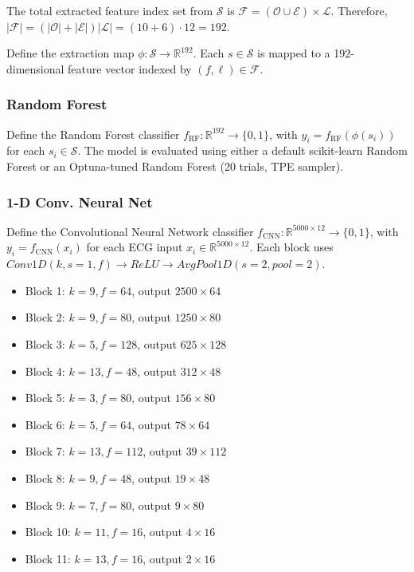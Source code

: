 \documentclass[sigconf,nonacm]{acmart}
\begin{document}
The total extracted feature index set from $\mathcal{S}$ is $\mathcal{F}=(\mathcal{O}\cup\mathcal{E})\times\mathcal{L}$.
Therefore, $|\mathcal{F}|=(|\mathcal{O}|+|\mathcal{E}|)|\mathcal{L}|=(10+6)\cdot 12=192$.

Define the extraction map $\phi:\mathcal{S}\to\mathbb{R}^{192}$.
Each $s\in\mathcal{S}$ is mapped to a 192-dimensional feature vector indexed by $(f,\ell)\in\mathcal{F}$.

\subsubsection{Random Forest}
Define the Random Forest classifier $f_{\mathrm{RF}}:\mathbb{R}^{192}\to\{0,1\}$, with $y_i=f_{\mathrm{RF}}(\phi(s_i))$ for each $s_i\in\mathcal{S}$.
The model is evaluated using either a default scikit-learn Random Forest or an Optuna-tuned Random Forest (20 trials, TPE sampler).

\subsubsection{1-D Conv. Neural Net}
Define the Convolutional Neural Network classifier $f_{\mathrm{CNN}}:\mathbb{R}^{5000 \times 12}\to\{0,1\}$, with
$y_i=f_{\mathrm{CNN}}(x_i)$ for each ECG input $x_i\in\mathbb{R}^{5000 \times 12}$.
Each block uses $Conv1D(k, s=1, f) \to ReLU \to AvgPool1D(s=2, pool=2)$.

\begin{itemize}
\item Block 1: $k=9, f=64$, output $2500 \times 64$
\item Block 2: $k=9, f=80$, output $1250 \times 80$
\item Block 3: $k=5, f=128$, output $625 \times 128$
\item Block 4: $k=13, f=48$, output $312 \times 48$
\item Block 5: $k=3, f=80$, output $156 \times 80$
\item Block 6: $k=5, f=64$, output $78 \times 64$
\item Block 7: $k=13, f=112$, output $39 \times 112$
\item Block 8: $k=9, f=48$, output $19 \times 48$
\item Block 9: $k=7, f=80$, output $9 \times 80$
\item Block 10: $k=11, f=16$, output $4 \times 16$
\item Block 11: $k=13, f=16$, output $2 \times 16$
\end{itemize}
\end{document}
